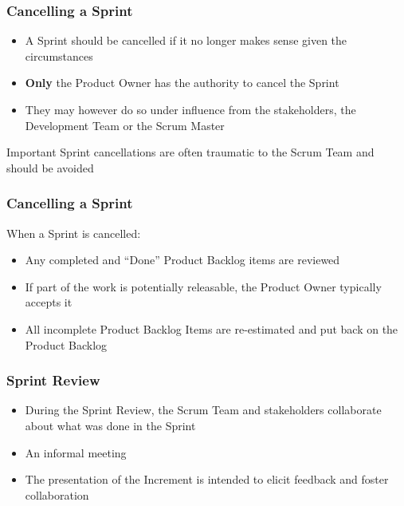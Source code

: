 \begin{frame}
    \frametitle{Cancelling a Sprint}
    \begin{itemize}
        \setlength\itemsep{0.7em}
        \item A Sprint should be cancelled if it no longer makes sense given the circumstances
        \item \textbf{Only} the Product Owner has the authority to cancel the Sprint
        \item They may however do so under influence from the stakeholders, the Development Team or the Scrum Master
    \end{itemize}
     {
        \vspace{1em}
        \begin{alertblock}{Important}
            Sprint cancellations are often traumatic to the Scrum Team and should be avoided
        \end{alertblock}
    }
\end{frame}

\begin{frame}
    \frametitle{Cancelling a Sprint}
    When a Sprint is cancelled:
    \vspace{1em}
    \begin{itemize}
        \setlength\itemsep{0.7em}
        \item Any completed and ``Done'' Product Backlog items are reviewed
        \item If part of the work is potentially releasable, the Product Owner typically accepts it
        \item All incomplete Product Backlog Items are re-estimated and put back on the Product Backlog
    \end{itemize}
\end{frame}

\begin{frame}
    \frametitle{Sprint Review}
    \begin{itemize}
        \setlength\itemsep{0.7em}
        \item During the Sprint Review, the Scrum Team and stakeholders collaborate about what was done in the Sprint
        \item An informal meeting
        \item The presentation of the Increment is intended to elicit feedback and foster collaboration
    \end{itemize}
\end{frame}

